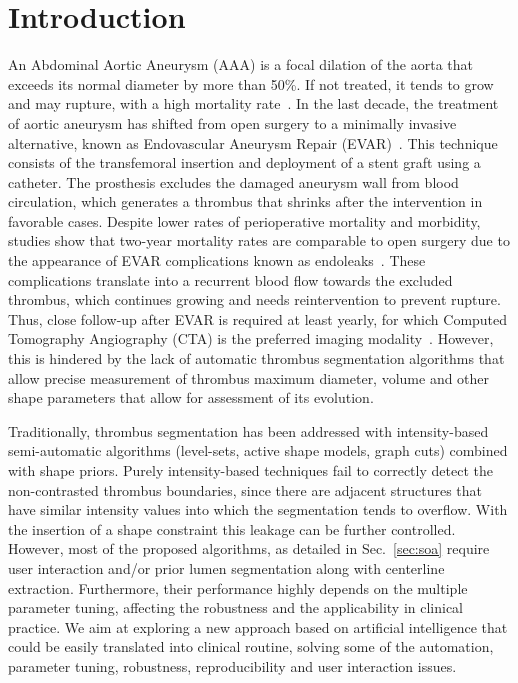 \documentclass[preprint,authoryear,12pt]{elsarticle}
\begin{document}
\section{Introduction}

An Abdominal Aortic Aneurysm (AAA) is a focal dilation of the aorta that exceeds its normal diameter by more than 50\%. If not treated, it tends to grow and may rupture, with a high mortality rate~\citep{Pear08}. In the last decade, the treatment of aortic aneurysm has shifted from open surgery to a minimally invasive alternative, known as Endovascular Aneurysm Repair (EVAR)~\citep{Mol11}. This technique consists of the transfemoral insertion and deployment of a stent graft using a catheter. The prosthesis excludes the damaged aneurysm wall from blood circulation, which generates a thrombus that shrinks after the intervention in favorable cases. Despite lower rates of perioperative mortality and morbidity, studies show that two-year mortality rates are comparable to open surgery due to the appearance of EVAR complications known as endoleaks~\citep{Sta13}. These complications translate into a recurrent blood flow towards the excluded thrombus, which continues growing and needs reintervention to prevent rupture. Thus, close follow-up after EVAR is required at least yearly, for which Computed Tomography Angiography (CTA) is the preferred imaging modality~\citep{wal10}. However, this is hindered by the lack of automatic thrombus segmentation algorithms that allow precise measurement of thrombus maximum diameter, volume and other shape parameters that allow for assessment of its evolution.

Traditionally, thrombus segmentation has been addressed with intensity-based semi-automatic algorithms (level-sets, active shape models, graph cuts) combined with shape priors. Purely intensity-based techniques fail to correctly detect the non-contrasted thrombus boundaries, since there are adjacent structures that have similar intensity values into which the segmentation tends to overflow. With the insertion of a shape constraint this leakage can be further controlled. However, most of the proposed algorithms, as detailed in Sec.~\ref{sec:soa} require user interaction and/or prior lumen segmentation along with centerline extraction. Furthermore, their performance highly depends on the multiple parameter tuning, affecting the robustness and the applicability in clinical practice. We aim at exploring a new approach based on artificial intelligence that could be easily translated into clinical routine, solving some of the automation, parameter tuning, robustness, reproducibility and user interaction issues. \par
\end{document}
